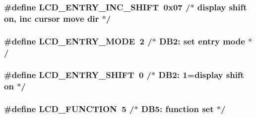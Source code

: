 \subsubsection[{\texorpdfstring{L\+C\+D\+\_\+\+E\+N\+T\+R\+Y\+\_\+\+I\+N\+C\+\_\+\+S\+H\+I\+FT}{LCD_ENTRY_INC_SHIFT}}]{\setlength{\rightskip}{0pt plus 5cm}\#define L\+C\+D\+\_\+\+E\+N\+T\+R\+Y\+\_\+\+I\+N\+C\+\_\+\+S\+H\+I\+FT~0x07   /$\ast$ display shift on,  inc cursor move dir $\ast$/}\hypertarget{group__pfleury__lcd_gafabd0215cc6ae5539dc638dbec44a506}{}\label{group__pfleury__lcd_gafabd0215cc6ae5539dc638dbec44a506}
\subsubsection[{\texorpdfstring{L\+C\+D\+\_\+\+E\+N\+T\+R\+Y\+\_\+\+M\+O\+DE}{LCD_ENTRY_MODE}}]{\setlength{\rightskip}{0pt plus 5cm}\#define L\+C\+D\+\_\+\+E\+N\+T\+R\+Y\+\_\+\+M\+O\+DE~2      /$\ast$ D\+B2\+: set entry mode                 $\ast$/}\hypertarget{group__pfleury__lcd_gae5d757ddb6d94de8c82191b60b40e442}{}\label{group__pfleury__lcd_gae5d757ddb6d94de8c82191b60b40e442}
\subsubsection[{\texorpdfstring{L\+C\+D\+\_\+\+E\+N\+T\+R\+Y\+\_\+\+S\+H\+I\+FT}{LCD_ENTRY_SHIFT}}]{\setlength{\rightskip}{0pt plus 5cm}\#define L\+C\+D\+\_\+\+E\+N\+T\+R\+Y\+\_\+\+S\+H\+I\+FT~0      /$\ast$   D\+B2\+: 1=display shift on           $\ast$/}\hypertarget{group__pfleury__lcd_ga14d0c7fda147e0dc8cdaa4a2629b3532}{}\label{group__pfleury__lcd_ga14d0c7fda147e0dc8cdaa4a2629b3532}
\subsubsection[{\texorpdfstring{L\+C\+D\+\_\+\+F\+U\+N\+C\+T\+I\+ON}{LCD_FUNCTION}}]{\setlength{\rightskip}{0pt plus 5cm}\#define L\+C\+D\+\_\+\+F\+U\+N\+C\+T\+I\+ON~5      /$\ast$ D\+B5\+: function set                   $\ast$/}\hypertarget{group__pfleury__lcd_ga50de1697f1da8ab075a6b4d7aeace64e}{}\label{group__pfleury__lcd_ga50de1697f1da8ab075a6b4d7aeace64e}
